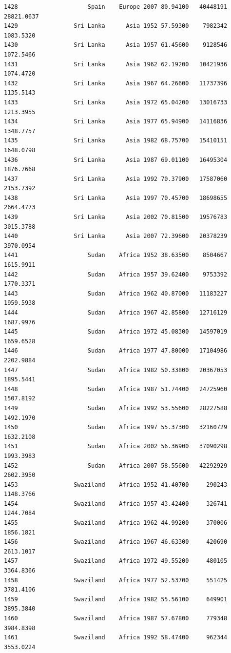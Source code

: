 \documentclass[
  letterpaper,
  DIV=11,
  numbers=noendperiod]{scrreprt}
\begin{document}
\begin{verbatim}
1428                    Spain    Europe 2007 80.94100   40448191  28821.0637
1429                Sri Lanka      Asia 1952 57.59300    7982342   1083.5320
1430                Sri Lanka      Asia 1957 61.45600    9128546   1072.5466
1431                Sri Lanka      Asia 1962 62.19200   10421936   1074.4720
1432                Sri Lanka      Asia 1967 64.26600   11737396   1135.5143
1433                Sri Lanka      Asia 1972 65.04200   13016733   1213.3955
1434                Sri Lanka      Asia 1977 65.94900   14116836   1348.7757
1435                Sri Lanka      Asia 1982 68.75700   15410151   1648.0798
1436                Sri Lanka      Asia 1987 69.01100   16495304   1876.7668
1437                Sri Lanka      Asia 1992 70.37900   17587060   2153.7392
1438                Sri Lanka      Asia 1997 70.45700   18698655   2664.4773
1439                Sri Lanka      Asia 2002 70.81500   19576783   3015.3788
1440                Sri Lanka      Asia 2007 72.39600   20378239   3970.0954
1441                    Sudan    Africa 1952 38.63500    8504667   1615.9911
1442                    Sudan    Africa 1957 39.62400    9753392   1770.3371
1443                    Sudan    Africa 1962 40.87000   11183227   1959.5938
1444                    Sudan    Africa 1967 42.85800   12716129   1687.9976
1445                    Sudan    Africa 1972 45.08300   14597019   1659.6528
1446                    Sudan    Africa 1977 47.80000   17104986   2202.9884
1447                    Sudan    Africa 1982 50.33800   20367053   1895.5441
1448                    Sudan    Africa 1987 51.74400   24725960   1507.8192
1449                    Sudan    Africa 1992 53.55600   28227588   1492.1970
1450                    Sudan    Africa 1997 55.37300   32160729   1632.2108
1451                    Sudan    Africa 2002 56.36900   37090298   1993.3983
1452                    Sudan    Africa 2007 58.55600   42292929   2602.3950
1453                Swaziland    Africa 1952 41.40700     290243   1148.3766
1454                Swaziland    Africa 1957 43.42400     326741   1244.7084
1455                Swaziland    Africa 1962 44.99200     370006   1856.1821
1456                Swaziland    Africa 1967 46.63300     420690   2613.1017
1457                Swaziland    Africa 1972 49.55200     480105   3364.8366
1458                Swaziland    Africa 1977 52.53700     551425   3781.4106
1459                Swaziland    Africa 1982 55.56100     649901   3895.3840
1460                Swaziland    Africa 1987 57.67800     779348   3984.8398
1461                Swaziland    Africa 1992 58.47400     962344   3553.0224

\end{verbatim}
\end{document}
